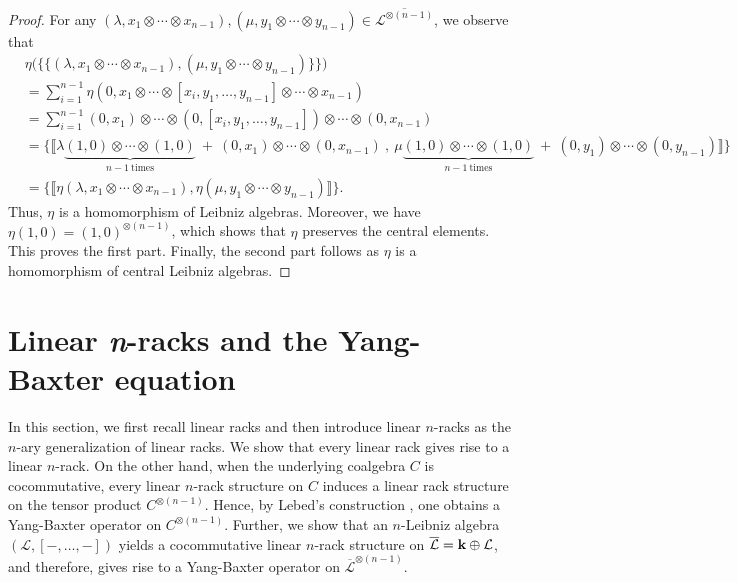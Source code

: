 \documentclass[a4paper,reqno,10pt]{amsart}
\theoremstyle{plain}
\theoremstyle{definition}
\theoremstyle{remark}
\begin{document}
\begin{proof}
    For any $(\lambda, x_1 \otimes \cdots \otimes x_{n-1}) , (\mu, y_1 \otimes \cdots \otimes y_{n-1}) \in  \overline{ \mathcal{L}^{\otimes (n-1)}}$, we observe that
    \begin{align*}
        &\eta \big(  \{ \! \! \{ (\lambda, x_1 \otimes \cdots \otimes x_{n-1}) ,  (\mu, y_1 \otimes \cdots \otimes y_{n-1})  \} \! \! \}  \big) \\
        &= \sum_{i=1}^{n-1} \eta (0, x_1 \otimes \cdots \otimes [x_i, y_1, \ldots, y_{n-1}] \otimes \cdots \otimes x_{n-1}) \\
        &= \sum_{i=1}^{n-1} (0, x_1) \otimes \cdots \otimes (0, [x_i, y_1, \ldots, y_{n-1}]) \otimes \cdots \otimes (0, x_{n-1}) \\
        &=  \{ \! \llbracket \lambda \underbrace{(1,0) \otimes \cdots \otimes (1, 0)}_{n-1 \mathrm{~ times}} ~\! + ~\! (0, x_1) \otimes \cdots \otimes (0, x_{n-1}) ~ \! , ~ \! \mu \underbrace{(1,0) \otimes \cdots \otimes (1, 0)}_{n-1 \mathrm{~ times }} ~ \! + ~\! (0, y_1) \otimes \cdots \otimes (0, y_{n-1}) \rrbracket \! \} \\
        &=  \{ \! \llbracket \eta ( \lambda, x_1 \otimes \cdots \otimes x_{n-1} ) , \eta (\mu, y_1 \otimes \cdots \otimes y_{n-1}) \rrbracket \! \}.
    \end{align*}
    Thus, $\eta$ is a homomorphism of Leibniz algebras. Moreover, we have $\eta (1, 0) = (1, 0)^{\otimes (n-1)}$, which shows that $\eta$ preserves the central elements. This proves the first part. Finally, the second part follows as $\eta$ is a homomorphism of central Leibniz algebras.
\end{proof}
    
\section{Linear {\em n}-racks and the Yang-Baxter equation}\label{sec4}
In this section, we first recall linear racks and then introduce linear $n$-racks as the $n$-ary generalization of linear racks. We show that every linear rack gives rise to a linear $n$-rack. On the other hand, when the underlying coalgebra $C$ is cocommutative, every linear $n$-rack structure on $C$ induces a linear rack structure on the tensor product $C^{\otimes (n-1)}$. Hence, by Lebed's construction \cite{lebed}, one obtains a Yang-Baxter operator on $C^{\otimes (n-1)}$. Further, we show that an $n$-Leibniz algebra $(\mathcal{L}, [-, \ldots, -])$ yields a cocommutative linear $n$-rack structure on $\overline{\mathcal{L}} = {\bf k} \oplus \mathcal{L}$, and therefore, gives rise to a Yang-Baxter operator on $\overline{\mathcal{L}}^{\otimes (n-1)}$.
\end{document}
